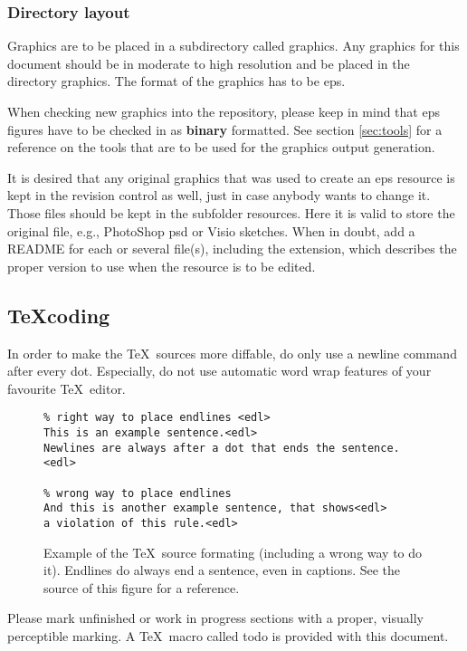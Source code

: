 \subsubsection{Directory layout}
Graphics are to be placed in a subdirectory called {\ttfamily graphics}.
Any graphics for this document should be in moderate to high resolution and be placed in the directory {\ttfamily graphics}.
The format of the graphics has to be {\ttfamily eps}.

When checking new graphics into the repository, please keep in mind that {\ttfamily eps} figures have to be checked in as \textbf{binary} formatted.
See section \ref{sec:tools} for a reference on the tools that are to be used for the graphics output generation.

It is desired that any original graphics that was used to create an {\ttfamily eps} resource is kept in the revision control as well, just in case anybody wants to change it.
Those files should be kept in the subfolder {\ttfamily resources}.
Here it is valid to store the original file, e.g., PhotoShop {\ttfamily psd} or Visio sketches.
When in doubt, add a {\ttfamily README} for each or several file(s), including the extension, which describes the proper version to use when the resource is to be edited.

\subsection{\TeX coding}
In order to make the \TeX\ sources more diffable, do only use a newline command after every dot.
Especially, do not use automatic word wrap features of your favourite \TeX\ editor.
\begin{figure}
\begin{verbatim}
% right way to place endlines <edl>
This is an example sentence.<edl>
Newlines are always after a dot that ends the sentence.<edl>

% wrong way to place endlines
And this is another example sentence, that shows<edl>
a violation of this rule.<edl>
\end{verbatim}
\caption{\label{fig:texlines}
Example of the \TeX\ source formating (including a wrong way to do it).
Endlines do always end a sentence, even in captions.
See the source of this figure for a reference.}
\end{figure}

Please mark unfinished or work in progress sections with a proper, visually perceptible marking.
A \TeX\ macro called {\ttfamily todo} is provided with this document.

